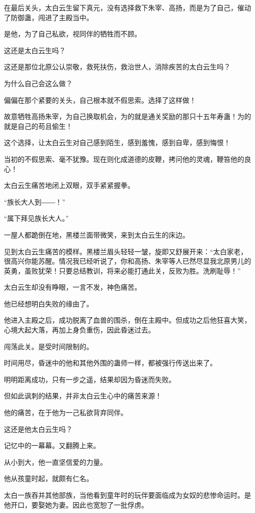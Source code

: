 \begin{this_body}
在最后关头，太白云生留下真元，没有选择救下朱宰、高扬，而是为了自己，催动了防御蛊，闯进了主殿当中。

是他，为了自己私欲，视同伴的牺牲而不顾。

这还是太白云生吗？

这还是那位北原公认崇敬，救死扶伤，救治世人，消除疾苦的太白云生吗？

为什么自己会这么做？

偏偏在那个紧要的关头，自己根本就不假思索。选择了这样做！

故意牺牲高扬朱宰，为自己换取机会，为的就是通关奖励的那只十五年寿蛊！为的就是自己的苟且偷生！

这个选择，让太白云生对自己感到陌生，感到羞愧，感到自卑，感到悔恨！

当初的不假思索、毫不犹豫。现在则化成道德的皮鞭，拷问他的灵魂，鞭笞他的良心！

太白云生痛苦地闭上双眼，双手紧紧握拳。

“族长大人到――！”

“属下拜见族长大人。”

一屋人都跪倒在地，黑楼兰面带微笑，来到太白云生的床边。

见到太白云生痛苦的模样。黑楼兰眉头轻轻一皱，旋即又舒展开来：“太白家老，很高兴你能苏醒。情况我已经听说了，你和高扬、朱宰等人已然尽显我北原男儿的英勇，虽败犹荣！只要总结教训，将来必能打通此关，反败为胜。洗刷耻辱！”

太白云生却没有睁眼，一言不发，神色痛苦。

他已经想明白失败的缘由了。

他进入主殿之后，成功脱离了血兽的围杀，倒在主殿中。但成功之后他狂喜大笑，心境大起大落，再加上身负重伤，因此昏迷过去。

闯荡此关。是受时间限制的。

时间用尽，昏迷中的他和其他外围的蛊师一样，都被强行传送出来了。

明明距离成功，只有一步之遥，结果却因为昏迷而失败。

但如此讽刺的结果，并非太白云生心中的痛苦来源！

他的痛苦，在于他为一己私欲背弃同伴。

这还是他太白云生吗？

记忆中的一幕幕。又翻腾上来。

从小到大，他一直坚信爱的力量。

他从孩童时起，就颇有仁名。

太白一族吞并其他部族，当他看到童年时的玩伴要面临成为女奴的悲惨命运时。是他开口，要娶她为妻。因此也宽恕了一批俘虏。


\end{this_body}
